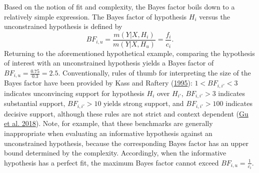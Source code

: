 \documentclass[
  11pt,
]{article}
\begin{document}
Based on the notion of fit and complexity, the Bayes factor boils down to a relatively simple expression.
The Bayes factor of hypothesis \(H_i\) versus the unconstrained hypothesis is defined by
\[
BF_{i,u} = \frac{m(Y | X, H_{i})}{m(Y|X, H_{u})} = \frac{f_i}{c_i}.
\]
Returning to the aforementioned hypothetical example, comparing the hypothesis of interest with an unconstrained hypothesis yields a Bayes factor of \(BF_{i,u} = \frac{0.75}{0.3} = 2.5\).
Conventionally, rules of thumb for interpreting the size of the Bayes factor have been provided by Kass and Raftery (\protect\hyperlink{ref-kass_raftery_bayes_factors_1995}{1995}): \(1 < BF_{i,i'} < 3\) indicates unconvincing support for hypothesis \(H_i\) over \(H_{i'}\), \(BF_{i,i'}>3\) indicates substantial support, \(BF_{i,i'}>10\) yields strong support, and \(BF_{i,i'}>100\) indicates decisive support, although these rules are not strict and context dependent (\protect\hyperlink{ref-gu_approximated_2018}{Gu et al. 2018}).
Note, for example, that these benchmarks are generally inappropriate when evaluating an informative hypothesis against an unconstrained hypothesis, because the corresponding Bayes factor has an upper bound determined by the complexity.
Accordingly, when the informative hypothesis has a perfect fit, the maximum Bayes factor cannot exceed \(BF_{i,u} = \frac{1}{c_i}\).
\end{document}
